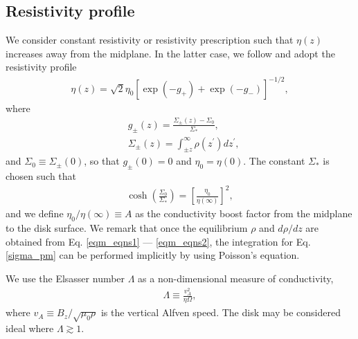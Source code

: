\subsection{Resistivity profile}\label{resis_profile}
We consider constant resistivity or 
resistivity prescription such that $\eta(z)$ increases away from the
midplane. In the latter case, we follow \cite{fleming03} and adopt the
resistivity profile 
\begin{align}
  \eta(z) =
  \sqrt{2}\eta_0\left[\exp{\left(-g_+\right)}+\exp{\left(-g_-\right)}\right]^{-1/2},  
\end{align}
where
\begin{align}
  &g_\pm(z) =  \frac{\Sigma_\pm(z)-\Sigma_0}{\Sigma_*}, \\
  &\Sigma_\pm(z) = \int_{\pm z}^\infty\rho(z^\prime)dz^\prime, \label{sigma_pm}
\end{align}
and $\Sigma_0\equiv\Sigma_{\pm}(0)$, so that $g_\pm(0)=0$ and $\eta_0 
= \eta(0)$. The constant $\Sigma_*$ is chosen such that 
\begin{align}
  \cosh{\left(\frac{\Sigma_0}{\Sigma_*}\right)} =
  \left[\frac{\eta_0}{\eta(\infty)}\right]^2,
\end{align}
and we define $\eta_0/\eta(\infty)\equiv A$ as the conductivity
boost factor from the midplane to the disk surface. We remark that
once the equilibrium $\rho$ and $d\rho/dz$ are obtained from
Eq. \ref{eqm_eqns1} --- \ref{eqm_eqns2}, the integration for
Eq. \ref{sigma_pm} can be performed implicitly by using Poisson's 
equation. 


We use the Elsasser number $\Lambda$ as a non-dimensional measure of
conductivity,
\begin{align} 
  \Lambda \equiv \frac{v_A^2}{\eta\Omega},
\end{align}
where $v_A \equiv B_z/\sqrt{\mu_0\rho}$ is the vertical Alfven speed. 
The disk may be considered ideal where $\Lambda
\gtrsim 1$. 





